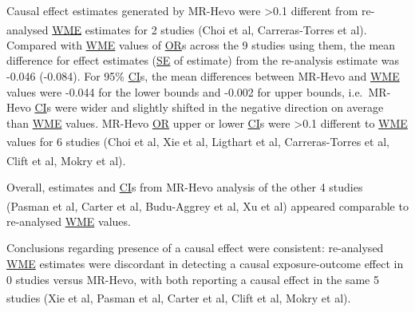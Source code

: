 \documentclass[
]{article}
\begin{document}
\leavevmode\newline Causal effect estimates generated by MR-Hevo were \textgreater0.1 different from re-analysed \hyperref[acronyms_WME]{WME} estimates for 2 studies (Choi et al\textsuperscript{}, Carreras-Torres et al\textsuperscript{}). Compared with \hyperref[acronyms_WME]{WME} values of \hyperref[acronyms_OR]{OR}s across the 9 studies using them, the mean difference for effect estimates (\hyperref[acronyms_SE]{SE} of estimate) from the re-analysis estimate was -0.046 (-0.084). For 95\% \hyperref[acronyms_CI]{CI}s, the mean differences between MR-Hevo and \hyperref[acronyms_WME]{WME} values were -0.044 for the lower bounds and -0.002 for upper bounds, i.e.~MR-Hevo \hyperref[acronyms_CI]{CI}s were wider and slightly shifted in the negative direction on average than \hyperref[acronyms_WME]{WME} values. MR-Hevo \hyperref[acronyms_OR]{OR} upper or lower \hyperref[acronyms_CI]{CI}s were \textgreater0.1 different to \hyperref[acronyms_WME]{WME} values for 6 studies (Choi et al\textsuperscript{}, Xie et al\textsuperscript{}, Ligthart et al\textsuperscript{}, Carreras-Torres et al\textsuperscript{}, Clift et al\textsuperscript{}, Mokry et al\textsuperscript{}).

Overall, estimates and \hyperref[acronyms_CI]{CI}s from MR-Hevo analysis of the other 4 studies (Pasman et al\textsuperscript{}, Carter et al\textsuperscript{}, Budu-Aggrey et al\textsuperscript{}, Xu et al\textsuperscript{}) appeared comparable to re-analysed \hyperref[acronyms_WME]{WME} values.

Conclusions regarding presence of a causal effect were consistent: re-analysed \hyperref[acronyms_WME]{WME} estimates were discordant in detecting a causal exposure-outcome effect in 0 studies versus MR-Hevo, with both reporting a causal effect in the same 5 studies (Xie et al\textsuperscript{}, Pasman et al\textsuperscript{}, Carter et al\textsuperscript{}, Clift et al\textsuperscript{}, Mokry et al\textsuperscript{}).
\end{document}
